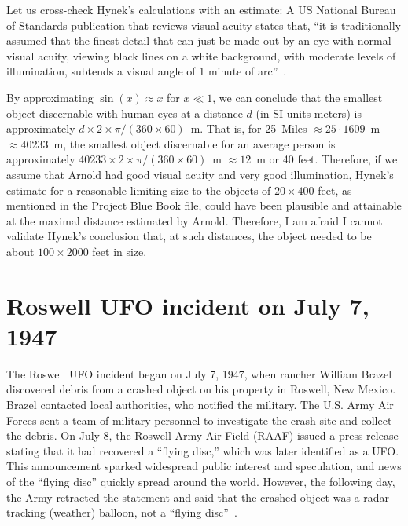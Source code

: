 Let us cross-check Hynek's calculations with an estimate: A US National Bureau of Standards publication that reviews visual acuity states that, ``it is traditionally assumed that the finest detail that can just be made out by an eye with normal visual acuity, viewing black lines on a white background, with moderate levels of illumination, subtends a visual angle of 1 minute of arc''~\cite[p.~10]{Howett1983Jul}.

By approximating $\sin(x) \approx x$ for $x\ll 1$,
we can conclude that the smallest object discernable with human eyes at a distance $d$ (in SI units meters)
is approximately $d \times 2 \times \pi /(360\times 60)$~m. That is, for 25~Miles $\approx 25 \cdot 1609$~m $\approx 40233$~m,
the smallest object discernable for an average person is approximately $40233 \times 2 \times \pi /(360\times 60)$~m
$\approx 12$~m or 40 feet.
Therefore, if we assume that Arnold had good visual acuity and very good illumination,
Hynek's estimate for a reasonable limiting size to the objects of $20 \times 400$ feet,
as mentioned in the Project Blue Book file, could have been plausible and attainable at the maximal distance estimated by Arnold.
Therefore, I am afraid I cannot validate Hynek's conclusion that, at such distances, the object needed to be about $100 \times 2000$ feet in size.




\section{Roswell UFO incident on July 7, 1947}

\label{2023-UFO-part-History-chapter-post-1945-pre-1947-RW}

The Roswell UFO incident began on July 7, 1947, when rancher William Brazel discovered debris from a crashed object on his property in Roswell, New Mexico. Brazel contacted local authorities, who notified the military. The U.S. Army Air Forces sent a team of military personnel to investigate the crash site and collect the debris. On July 8, the Roswell Army Air Field (RAAF) issued a press release stating that it had recovered a ``flying disc,'' which was later identified as a UFO. This announcement sparked widespread public interest and speculation, and news of the ``flying disc'' quickly spread around the world. However, the following day, the Army retracted the statement and said that the crashed object was a radar-tracking (weather) balloon, not a ``flying disc''~\cite{Davis1995}.

